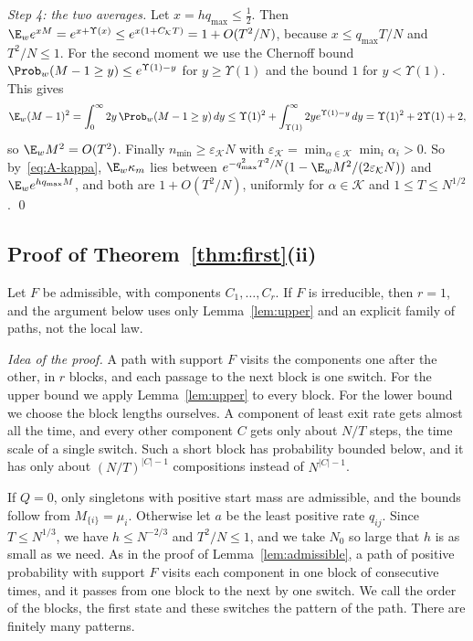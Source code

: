 \emph{Step 4: the two averages.} Let $x=hq_{\max}\le\frac12$. Then
$\E_we^{xM}=e^{x+\Upsilon(x)}\le e^{x(1+C_{\mathcal K}T)}=1+O(T^2/N)$, because
$x\le q_{\max}T/N$ and $T^2/N\le1$. For the second moment we use the Chernoff
bound $\Prob_w(M-1\ge y)\le e^{\Upsilon(1)-y}$ for $y\ge\Upsilon(1)$ and the bound $1$
for $y<\Upsilon(1)$. This gives
\[
\E_w(M-1)^2=\int_0^\infty2y\,\Prob_w(M-1\ge y)\,dy
\le\Upsilon(1)^2+\int_{\Upsilon(1)}^\infty2ye^{\Upsilon(1)-y}\,dy
=\Upsilon(1)^2+2\Upsilon(1)+2,
\]
so $\E_wM^2=O(T^2)$. Finally $n_{\min}\ge\varepsilon_{\mathcal K}N$ with
$\varepsilon_{\mathcal K}=\min_{\alpha\in\mathcal K}\min_i\alpha_i>0$. So
by~\eqref{eq:A-kappa}, $\E_w\kappa_m$ lies between
$e^{-q_{\max}^2T^2/N}(1-\E_wM^2/(2\varepsilon_{\mathcal K}N))$ and
$\E_we^{hq_{\max}M}$, and both are $1+O(T^2/N)$, uniformly for
$\alpha\in\mathcal K$ and $1\le T\le N^{1/2}$. \qed

\subsection{Proof of \texorpdfstring{Theorem~\ref{thm:first}(ii)}{the
first-order bounds}}\label{app:first}

Let $F$ be admissible, with components $C_1,\dots,C_r$. If $F$ is irreducible,
then $r=1$, and the argument below uses only Lemma~\ref{lem:upper} and an explicit
family of paths, not the local law.

\emph{Idea of the proof.} A path with support $F$ visits the components one
after the other, in $r$ blocks, and each passage to the next block is one
switch. For the upper bound we apply Lemma~\ref{lem:upper} to every block.
For the lower bound we choose the block lengths ourselves. A component of
least exit rate gets almost all the time, and every other component $C$ gets
only about $N/T$ steps, the time scale of a single switch. Such a short block
has probability bounded below, and it has only about $(N/T)^{|C|-1}$
compositions instead of $N^{|C|-1}$.

If $Q=0$, only singletons with positive start mass are admissible, and the bounds
follow from $M_{\{i\}}=\mu_i$. Otherwise let $a$ be the least positive rate $q_{ij}$.
Since $T\le N^{1/3}$, we have
$h\le N^{-2/3}$ and $T^2/N\le1$, and we take $N_0$ so large that $h$ is as
small as we need. As in the
proof of Lemma~\ref{lem:admissible}, a path of positive probability with
support $F$ visits each component in one block of consecutive times, and it
passes from one block to the next by one switch. We call the order of the
blocks, the first state and these switches the pattern of the path. There are
finitely many patterns.

